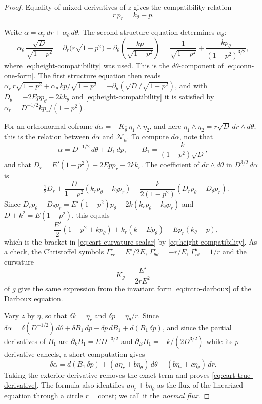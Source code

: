 \begin{proof}
Equality of mixed derivatives of $z$ gives the compatibility relation
\begin{equation}\label{eq:height-compatibility}
 r\,p_r=k_\theta-p .
\end{equation}

Write $\alpha=\alpha_r\,dr+\alpha_\theta\,d\theta$. The second
structure equation determines $\alpha_\theta$:
\[
 \alpha_\theta\,\frac{\sqrt D}{\sqrt{1-p^2}}
 =\partial_r\bigl(r\sqrt{1-p^2}\bigr)
  +\partial_\theta\!\left(\frac{kp}{\sqrt{1-p^2}}\right)
 =\frac1{\sqrt{1-p^2}}+\frac{kp_\theta}{(1-p^2)^{3/2}},
\]
where \eqref{eq:height-compatibility} was used. This is the
$d\theta$-component of \eqref{eq:conn-one-form}. The first structure
equation then reads
$\alpha_r\,r\sqrt{1-p^2}+\alpha_\theta\,kp/\sqrt{1-p^2}
 =-\partial_\theta(\sqrt D/\sqrt{1-p^2})$,
and with $D_\theta=-2Epp_\theta-2kk_\theta$ and
\eqref{eq:height-compatibility} it is satisfied by
$\alpha_r=D^{-1/2}kp_r/(1-p^2)$.

For an orthonormal coframe $d\alpha=-K_{\bar g}\,\eta_1\wedge\eta_2$,
and here $\eta_1\wedge\eta_2=r\sqrt D\,dr\wedge d\theta$; this is the
relation between $d\alpha$ and $\mathcal N_h$. To compute $d\alpha$,
note that
\[
 \alpha=D^{-1/2}\,d\theta+B_1\,dp,\qquad
 B_1=\frac{k}{(1-p^2)\sqrt D},
\]
and that $D_r=E'(1-p^2)-2Epp_r-2kk_r$. The coefficient of
$dr\wedge d\theta$ in $D^{3/2}\,d\alpha$ is
\[
 -\tfrac12D_r+\frac{D}{1-p^2}(k_rp_\theta-k_\theta p_r)
 -\frac{k}{2(1-p^2)}(D_rp_\theta-D_\theta p_r).
\]
Since $D_rp_\theta-D_\theta p_r
 =E'(1-p^2)p_\theta-2k(k_rp_\theta-k_\theta p_r)$ and $D+k^2=E(1-p^2)$,
this equals
\[
 -\frac{E'}2(1-p^2+kp_\theta)+k_r(k+Ep_\theta)-Ep_r(k_\theta-p),
\]
which is the bracket in \eqref{eq:cart-curvature-scalar} by
\eqref{eq:height-compatibility}. As a check, the Christoffel symbols
$\Gamma^r_{rr}=E'/2E$, $\Gamma^r_{\theta\theta}=-r/E$,
$\Gamma^\theta_{r\theta}=1/r$ and the curvature
\begin{equation}\label{eq:radial-curvature}
 K_g=\frac{E'}{2rE^2}
\end{equation}
of $g$ give the same expression from the invariant form
\eqref{eq:intro-darboux} of the Darboux equation.

Vary $z$ by $\eta$, so that $\delta k=\eta_r$ and
$\delta p=\eta_\theta/r$. Since
$\delta\alpha=\delta(D^{-1/2})\,d\theta+\delta B_1\,dp-\delta p\,dB_1
 +d(B_1\,\delta p)$,
and since the partial derivatives of $B_1$ are
$\partial_kB_1=ED^{-3/2}$ and $\partial_EB_1=-k/(2D^{3/2})$ while its
$p$-derivative cancels, a short computation gives
\begin{equation}\label{eq:conn-exact-variation}
 \delta\alpha=d(B_1\,\delta p)
  +(a\eta_r+b\eta_\theta)\,d\theta
  -(b\eta_r+c\eta_\theta)\,dr .
\end{equation}
Taking the exterior derivative removes the exact term and proves
\eqref{eq:cart-true-derivative}. The formula also identifies
$a\eta_r+b\eta_\theta$ as the flux of the linearized equation through
a circle $r=\text{const}$; we call it the \emph{normal flux}.


\end{proof}
